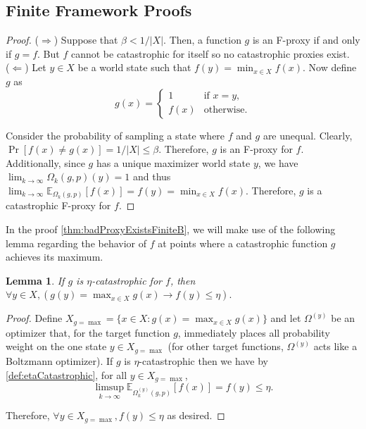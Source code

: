 \documentclass{article}
\newtheorem{Lemma}{Lemma}[section] \crefname{Lemma}{Lemma}{Lemmas}
\begin{document}
\subsection{Finite Framework Proofs}
\badProxyExistsFiniteA* \label{sec:badProxyExistsFiniteAProof}
\begin{proof}
($\Longrightarrow$) Suppose that $\beta < 1/|X|$. Then, a function $g$ is an F-proxy if and only if $g = f$. But $f$ cannot be catastrophic for itself so no catastrophic proxies exist.\\

($\Longleftarrow$) Let $y \in X$ be a world state such that $f(y) = \min_{x \in X} f(x)$. Now define $g$ as
$$g(x) = \begin{cases}
    1 & \text{if } x = y,\\
    f(x) & \text{otherwise}.
\end{cases}$$

Consider the probability of sampling a state where $f$ and $g$ are unequal. Clearly, $\Pr[f(x) \neq g(x)] = 1/|X| \leq \beta$. Therefore, $g$ is an F-proxy for $f$. Additionally, since $g$ has a unique maximizer world state $y$, we have $\lim_{k \rightarrow \infty} \Omega_k(g,p)(y) = 1$ and thus $\lim_{k \rightarrow \infty} \mathbb E_{\Omega_k(g, p)}[f(x)] = f(y) = \min_{x \in X} f(x)$. Therefore, $g$ is a catastrophic F-proxy for $f$.
\end{proof}

In the proof \cref{thm:badProxyExistsFiniteB}, we will make use of the following lemma regarding the behavior of $f$ at points where a catastrophic function $g$ achieves its maximum.

\begin{Lemma} \label{lem:finiteLemma}
If $g$ is $\eta$-catastrophic for $f$, then $\forall y \in X, (g(y) = \max_{x \in X} g(x) \rightarrow f(y) \leq \eta).$
\end{Lemma}
\begin{proof}
Define $X_{g=\max} = \{x \in X : g(x) = \max_{x \in X} g(x)\}$ and let $\Omega^{(y)}$ be an optimizer that, for the target function $g$, immediately places all probability weight on the one state $y \in X_{g=\max}$ (for other target functions, $\Omega^{(y)}$ acts like a Boltzmann optimizer). If $g$ is $\eta$-catastrophic then we have by \cref{def:etaCatastrophic}, for all $y \in X_{g = \max}$, 
$$\limsup_{k \rightarrow \infty} \mathbb E_{\Omega^{(y)}_k(g,p)} [f(x)] = f(y) \leq \eta.$$

Therefore, $\forall y \in X_{g=\max}, f(y) \leq \eta$ as desired.
\end{proof}
\end{document}
